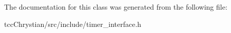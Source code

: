The documentation for this class was generated from the following file\-:\begin{DoxyCompactItemize}
\item 
tcc\-Chrystian/src/include/timer\-\_\-interface.\-h\end{DoxyCompactItemize}
